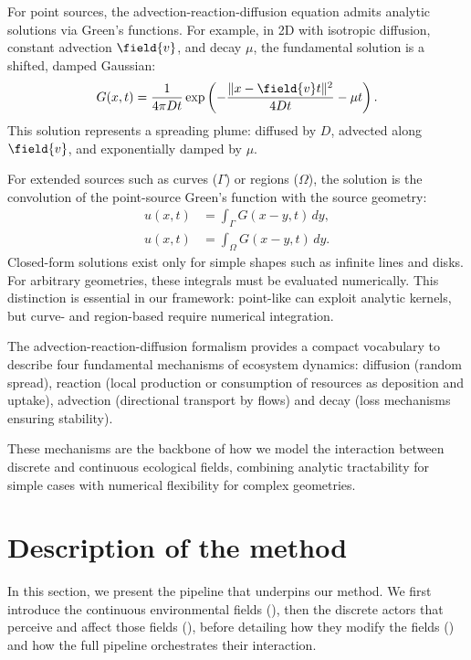 For point sources, the advection-reaction-diffusion equation admits analytic solutions via Green's functions. For example, in 2D with isotropic diffusion, constant advection $\field{v}$, and decay $\mu$, the fundamental solution is a shifted, damped Gaussian:
\begin{align}
    G(x,t) = \frac{1}{4\pi D t} \exp \left( -\frac{\|x - \field{v}t\|^2}{4Dt} - \mu t \right).
\end{align}
This solution represents a spreading plume: diffused by $D$, advected along $\field{v}$, and exponentially damped by $\mu$.  

For extended sources such as curves ($\Gamma$) or regions ($\Omega$), the solution is the convolution of the point-source Green's function with the source geometry:
\begin{align}
    u(x,t) &= \int_\Gamma G(x-y,t)\,dy, \\
    u(x,t) &= \int_\Omega G(x-y,t)\,dy.
\end{align}
Closed-form solutions exist only for simple shapes such as infinite lines and disks. For arbitrary geometries, these integrals must be evaluated numerically.  
This distinction is essential in our framework: point-like  can exploit analytic kernels, but curve- and region-based  require numerical integration.

\midConclusion 
The advection-reaction-diffusion formalism provides a compact vocabulary to describe four fundamental mechanisms of ecosystem dynamics: diffusion (random spread), reaction (local production or consumption of resources as  deposition and uptake), advection (directional transport by flows) and decay (loss mechanisms ensuring stability).

These mechanisms are the backbone of how we model the interaction between discrete  and continuous ecological fields, combining analytic tractability for simple cases with numerical flexibility for complex geometries.

\section{Description of the method}
\label{sec:env-obj-pipeline}

In this section, we present the pipeline that underpins our method.
We first introduce the continuous environmental fields (), then the discrete actors that perceive and affect those fields (), before detailing how they modify the fields () and how the full pipeline orchestrates their interaction.

